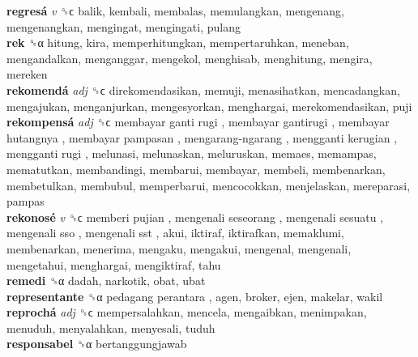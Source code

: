 \textbf{regresá} \emph{v}  ␝ϲ  balik, kembali, membalas, memulangkan, mengenang, mengenangkan, mengingat, mengingati, pulang  \\
\textbf{rek} ␝α  hitung, kira, memperhitungkan, mempertaruhkan, meneban, mengandalkan, menganggar, mengekol, menghisab, menghitung, mengira, mereken  \\
\textbf{rekomendá} \emph{adj}  ␝ϲ  direkomendasikan, memuji, menasihatkan, mencadangkan, mengajukan, menganjurkan, mengesyorkan, menghargai, merekomendasikan, puji  \\
\textbf{rekompensá} \emph{adj}  ␝ϲ   membayar ganti rugi ,  membayar gantirugi ,  membayar hutangnya ,  membayar pampasan ,  mengarang-ngarang ,  mengganti kerugian ,  mengganti rugi , melunasi, melunaskan, meluruskan, memaes, memampas, mematutkan, membandingi, membarui, membayar, membeli, membenarkan, membetulkan, membubul, memperbarui, mencocokkan, menjelaskan, mereparasi, pampas  \\
\textbf{rekonosé} \emph{v}  ␝ϲ   memberi pujian ,  mengenali seseorang ,  mengenali sesuatu ,  mengenali sso ,  mengenali sst , akui, iktiraf, iktirafkan, memaklumi, membenarkan, menerima, mengaku, mengakui, mengenal, mengenali, mengetahui, menghargai, mengiktiraf, tahu  \\
\textbf{remedi} ␝α  dadah, narkotik, obat, ubat  \\
\textbf{representante} ␝α   pedagang perantara , agen, broker, ejen, makelar, wakil  \\
\textbf{reprochá} \emph{adj}  ␝ϲ  mempersalahkan, mencela, mengaibkan, menimpakan, menuduh, menyalahkan, menyesali, tuduh  \\
\textbf{responsabel} ␝α  bertanggungjawab  \\
